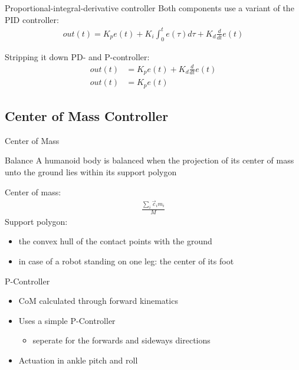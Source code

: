 \documentclass{beamer}
\begin{document}
\begin{frame}{Proportional-integral-derivative controller}
  Both components use a variant of the PID controller:
  \begin{align*}
    out(t) = K_p e(t) + K_i \int_{0}^{t} e(\tau) d\tau + K_d \frac{d}{dt} e(t)
  \end{align*}
\end{frame}

\begin{frame}{Stripping it down}
  PD- and P-controller:
  \begin{align*}
    out(t) &= K_p e(t) + K_d \frac{d}{dt} e(t) \\
    out(t) &= K_p e(t)
  \end{align*}
\end{frame}

\subsection{Center of Mass Controller}
\begin{frame}{Center of Mass}
  \begin{block}{Balance}
    A humanoid body is balanced when the projection of its center of
mass unto the ground lies within its support polygon
  \end{block}
  Center of mass:
  \begin{align*}
    \frac{\sum_i \vec{c}_i m_i}{M}
  \end{align*}
  Support polygon:
  \begin{itemize}
    \item the convex hull of the contact points with the ground
    \item in case of a robot standing on one leg: the center of its foot
  \end{itemize}
\end{frame}

\begin{frame}{P-Controller}
  \begin{itemize}
    \item CoM calculated through forward kinematics
    \item Uses a simple P-Controller
    \begin{itemize}
      \item seperate for the forwards and sideways directions
    \end{itemize}
    \item Actuation in ankle pitch and roll
  \end{itemize}
\end{frame}
\end{document}
